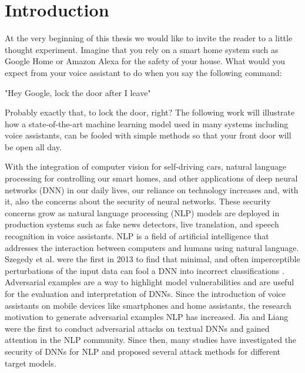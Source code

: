 
\section{Introduction}

At the very beginning of this thesis we would like to invite the reader to a little thought experiment. Imagine that you rely on a smart home system such as Google Home or Amazon Alexa for the safety of your house. What would you expect from your voice assistant to do when you say the following command:

"Hey Google, lock the door after I leave"

Probably exactly that, to lock the door, right? The following work will illustrate how a state-of-the-art machine learning model used in many systems including voice assistants, can be fooled with simple methods so that your front door will be open all day. 

With the integration of computer vision for self-driving cars, natural language processing for controlling our smart homes, and other applications of deep neural networks (DNN) in our daily lives, our reliance on technology increases and, with it, also the concerns about the security of neural networks. These security concerns grow as natural language processing (NLP) models are deployed in production systems such as fake news detectors, live translation, and speech recognition in voice assistants. NLP is a field of artificial intelligence that addresses the interaction between computers and humans using natural language.  
Szegedy et al. were the first in 2013 to find that minimal, and often imperceptible perturbations of the input data can fool a DNN into incorrect classifications \cite{szegedy2013intriguing}.
Adversarial examples are a way to highlight model vulnerabilities and are useful for the evaluation and interpretation of DNNs. 
Since the introduction of voice assistants on mobile devices like smartphones and home assistants, the research motivation to generate adversarial examples NLP has increased. Jia and Liang were the first to conduct adversarial attacks on textual DNNs and gained attention in the NLP community\cite{Jia2017AdversarialEF}. Since then, many studies have investigated the security of DNNs for NLP and proposed several attack methods for different target models. 

